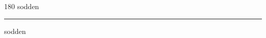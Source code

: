 
\begin{frame}
\begin{center}
\begin{turn}{180}
{\fontsize{2.5cm}{1em}\selectfont sodden}
\end{turn}
\vspace{1em}\par  
\hrule
\vspace{1em}\par  
{\fontsize{2.5cm}{1em}\selectfont sodden}
\end{center}
\end{frame}
